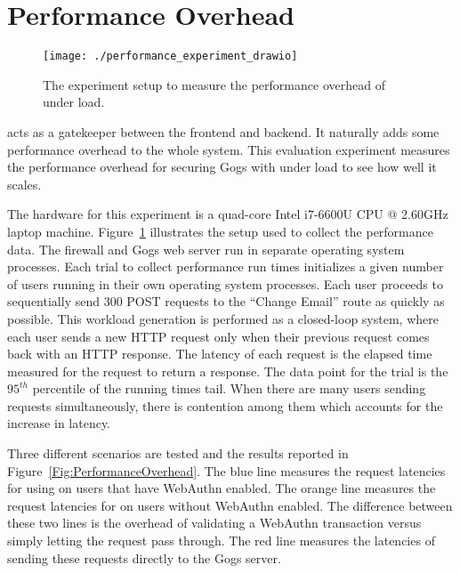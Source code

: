 \section{Performance Overhead}\label{Sec:PerformanceOverhead}

\begin{figure}
  \centering
  \texttt{[image: ./performance\_experiment\_drawio]}
  \caption{The experiment setup to measure the performance overhead of \sys{} under load.}
  \label{Fig:PerformanceExperimentSetup}
\end{figure}

\sys{} acts as a gatekeeper between the frontend and backend. It naturally adds some performance overhead to the whole system. This evaluation experiment measures the performance overhead for securing Gogs with \sys{} under load to see how well it scales. 


The hardware for this experiment is a quad-core Intel i7-6600U CPU @ 2.60GHz laptop machine. Figure~\ref{Fig:PerformanceExperimentSetup} illustrates the setup used to collect the performance data. The firewall and Gogs web server run in separate operating system processes. Each trial to collect performance run times initializes a given number of users running in their own operating system processes. Each user proceeds to sequentially send 300 POST requests to the ``Change Email'' route as quickly as possible. This workload generation is performed as a closed-loop system, where each user sends a new HTTP request only when their previous request comes back with an HTTP response. The latency of each request is the elapsed time measured for the request to return a response. The data point for the trial is the $95^{th}$ percentile of the running times tail. When there are many users sending requests simultaneously, there is contention among them which accounts for the increase in latency.

Three different scenarios are tested and the results reported in Figure~\ref{Fig:PerformanceOverhead}. The blue line measures the request latencies for using \sys{} on users that have WebAuthn enabled. The orange line measures the request latencies for \sys{} on users without WebAuthn enabled. The difference between these two lines is the overhead of validating a WebAuthn transaction versus simply letting the request pass through. The red line measures the latencies of sending these requests directly to the Gogs server.

